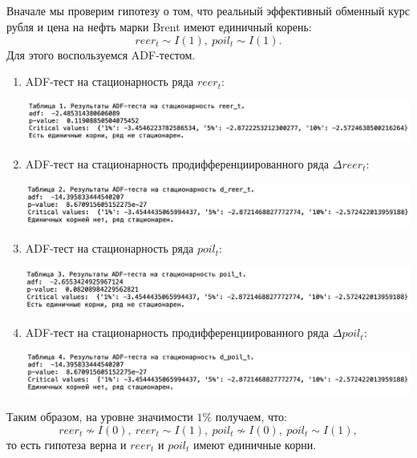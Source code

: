 \documentclass{article}
\begin{document}
\subsection{}
Вначале мы проверим гипотезу о том, что реальный эффективный обменный курс рубля и цена на нефть марки Brent имеют единичный корень:
$$reer_t\sim I(1),~poil_t\sim I(1).$$
Для этого воспользуемся ADF-тестом.
\begin{enumerate}
\item ADF-тест на стационарность ряда $reer_t$:
\begin{center}
\includegraphics[width=150mm]{pics/table_adf_reer.png}
\end{center}

\item ADF-тест на стационарность продифференциированного ряда 
$\Delta reer_t$:
\begin{center}
\includegraphics[width=150mm]{pics/table_adf_dreer.png}
\end{center}

\item ADF-тест на стационарность ряда $poil_t$:
\begin{center}
\includegraphics[width=150mm]{pics/table_adf_poil.png}
\end{center}

\item ADF-тест на стационарность продифференциированного ряда 
$\Delta poil_t$:
\begin{center}
\includegraphics[width=150mm]{pics/table_adf_dpoil.png}
\end{center}
\end{enumerate}
Таким образом, на уровне значимости $1\%$ получаем, что:
$$reer_t\nsim I(0),~reer_t\sim I(1),~poil_t\nsim I(0),~poil_t\sim I(1),$$
то есть гипотеза верна и $reer_t$ и $poil_t$ имеют единичные корни.
\end{document}
